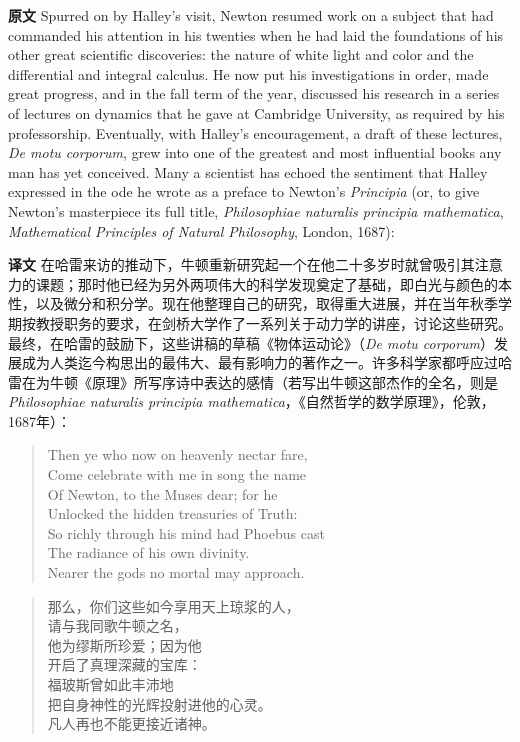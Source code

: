 \documentclass[UTF8,zihao=-4]{ctexart}
\begin{document}
\noindent\textbf{原文} Spurred on by Halley's visit, Newton resumed work on a subject that had commanded his attention in his twenties when he had laid the foundations of his other great scientific discoveries: the nature of white light and color and the differential and integral calculus. He now put his investigations in order, made great progress, and in the fall term of the year, discussed his research in a series of lectures on dynamics that he gave at Cambridge University, as required by his professorship. Eventually, with Halley's encouragement, a draft of these lectures, \emph{De motu corporum}, grew into one of the greatest and most influential books any man has yet conceived. Many a scientist has echoed the sentiment that Halley expressed in the ode he wrote as a preface to Newton's \emph{Principia} (or, to give Newton's masterpiece its full title, \emph{Philosophiae naturalis principia mathematica}, \emph{Mathematical Principles of Natural Philosophy}, London, 1687):
\par\noindent\textbf{译文} 在哈雷来访的推动下，牛顿重新研究起一个在他二十多岁时就曾吸引其注意力的课题；那时他已经为另外两项伟大的科学发现奠定了基础，即白光与颜色的本性，以及微分和积分学。现在他整理自己的研究，取得重大进展，并在当年秋季学期按教授职务的要求，在剑桥大学作了一系列关于动力学的讲座，讨论这些研究。最终，在哈雷的鼓励下，这些讲稿的草稿《物体运动论》（\emph{De motu corporum}）发展成为人类迄今构思出的最伟大、最有影响力的著作之一。许多科学家都呼应过哈雷在为牛顿《原理》所写序诗中表达的感情（若写出牛顿这部杰作的全名，则是\emph{Philosophiae naturalis principia mathematica}，《自然哲学的数学原理》，伦敦，1687年）：
\medskip

\begin{verse}
Then ye who now on heavenly nectar fare,\\
Come celebrate with me in song the name\\
Of Newton, to the Muses dear; for he\\
Unlocked the hidden treasuries of Truth:\\
So richly through his mind had Phoebus cast\\
The radiance of his own divinity.\\
Nearer the gods no mortal may approach.
\end{verse}

\begin{verse}
那么，你们这些如今享用天上琼浆的人，\\
请与我同歌牛顿之名，\\
他为缪斯所珍爱；因为他\\
开启了真理深藏的宝库：\\
福玻斯曾如此丰沛地\\
把自身神性的光辉投射进他的心灵。\\
凡人再也不能更接近诸神。
\end{verse}
\end{document}
